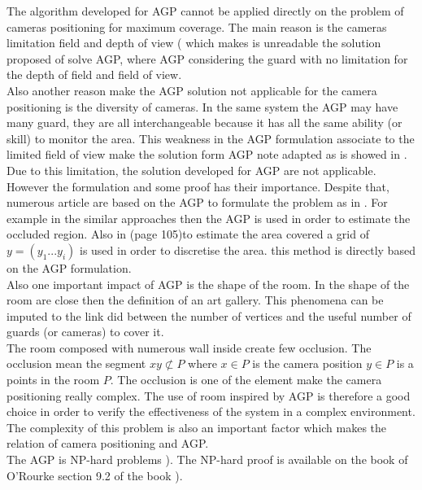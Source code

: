 The algorithm developed for AGP cannot be applied directly on the problem of cameras positioning for maximum coverage. The main reason is the cameras limitation field and depth of view (\cite{82*chrysostomou2012,170*yabuta2008} which makes is unreadable the solution proposed of solve AGP, where AGP considering the guard with no limitation for the depth of field and field of view. \\
Also another reason make the AGP solution not applicable for the camera positioning is the diversity of cameras. In the same system the AGP may have many guard, they are all interchangeable because it has all the same ability (or skill) to monitor the area. This weakness in the AGP formulation associate to the limited field of view  make the solution form AGP note adapted as  is showed in \cite{81*nikolaidis2009,171*horster2006}.\\
Due to this limitation, the solution developed for AGP are not applicable. However the formulation and some proof has their importance. 
Despite that, numerous article are based on the AGP to formulate the problem as in \cite{43*erdem2006,53*packer2008}. For example in \cite{43*erdem2006} the similar approaches then the AGP is used  in order to estimate the occluded   region. Also in \cite{53*packer2008} (page 105)to estimate the area covered a grid of $y= (y_1 ...y_i)$ is used in order to discretise the area. this method is directly based on the AGP formulation.\\
Also one important impact of AGP is the shape of the room. In \cite{170*yabuta2008,171*horster2006,33*reddy2012,43*erdem2006} the shape of the room are close then the definition of an art gallery. This phenomena can be imputed to the link did between the number of vertices and the useful number of guards (or cameras) to cover it. \\
The room composed with numerous wall inside create few occlusion. The occlusion mean the segment $xy \not\subset P$   where $x \in P$ is the camera position $y \in P$ is a points in the room $P$. The occlusion is one of the element make the camera positioning really complex. The use of room inspired by  AGP is therefore a good choice in order to verify the effectiveness of the system in a complex environment.\\
The complexity of this problem is also an important factor which makes the relation of camera positioning and AGP. \\
The AGP is NP-hard problems \cite{219*orourke1987}). The NP-hard proof is available on the book of O’Rourke section 9.2 of the book \cite{219*orourke1987}). \\
